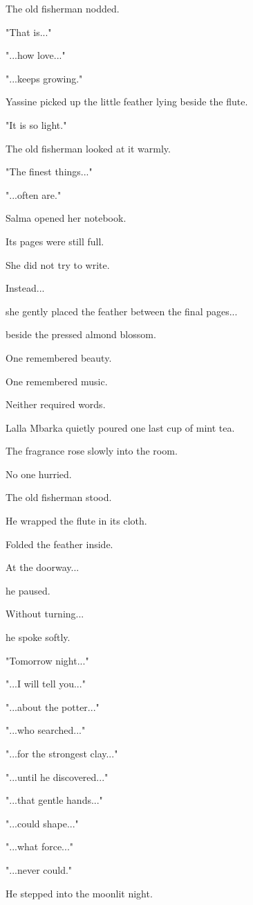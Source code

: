 \documentclass[12pt,openany]{book}
\begin{document}
The old fisherman nodded.

"That is..."

"...how love..."

"...keeps growing."

Yassine picked up the little feather lying beside the flute.

"It is so light."

The old fisherman looked at it warmly.

"The finest things..."

"...often are."

Salma opened her notebook.

Its pages were still full.

She did not try to write.

Instead...

she gently placed the feather between the final pages...

beside the pressed almond blossom.

One remembered beauty.

One remembered music.

Neither required words.

Lalla Mbarka quietly poured one last cup of mint tea.

The fragrance rose slowly into the room.

No one hurried.

The old fisherman stood.

He wrapped the flute in its cloth.

Folded the feather inside.

At the doorway...

he paused.

Without turning...

he spoke softly.

"Tomorrow night..."

"...I will tell you..."

"...about the potter..."

"...who searched..."

"...for the strongest clay..."

"...until he discovered..."

"...that gentle hands..."

"...could shape..."

"...what force..."

"...never could."

He stepped into the moonlit night.
\end{document}
